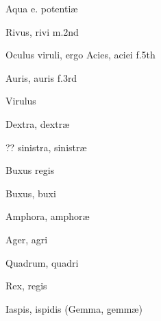  {\mktsStyleItalic{}Aqua e. potentiæ\/}


 {\mktsStyleItalic{}Rivus\/}, rivi {\mktsStyleItalic{}m.2nd\/}


 {\mktsStyleItalic{}Oculus viruli\/}, ergo {\mktsStyleItalic{}Acies\/}, aciei {\mktsStyleItalic{}f.5th\/}


 {\mktsStyleItalic{}Auris\/}, auris {\mktsStyleItalic{}f.3rd\/}


 {\mktsStyleItalic{}Virulus\/}


 {\mktsStyleItalic{}Dextra\/}, dextræ


?? sinistra, sinistræ


 {} {\mktsStyleItalic{}Buxus regis\/}


 {\mktsStyleItalic{}Buxus\/}, buxi


 {\mktsStyleItalic{}Amphora\/}, amphoræ


 {\mktsStyleItalic{}Ager, agri\/}


 {\mktsStyleItalic{}Quadrum\/}, quadri


 {\mktsStyleItalic{}Rex\/}, regis


 {\mktsStyleItalic{}Iaspis\/}, ispidis ({\mktsStyleItalic{}Gemma\/}, gemmæ)


